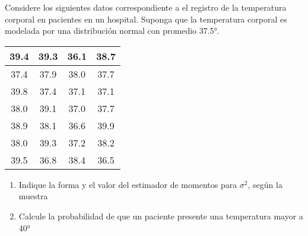 \documentclass[12pt]{article}
\newenvironment{problem}[2][Problema]{\begin{trivlist}
\item[\hskip \labelsep {\bfseries #1}\hskip \labelsep {\bfseries #2.}]}{\end{trivlist}}
\begin{document}
\begin{problem}{III}
Considere los siguientes datos correspondiente a el registro de la temperatura corporal en pacientes en un hospital. Suponga que la temperatura corporal es modelada por una distribución normal con promedio 37.5°.
\begin{table}[h!]
    \centering
    \begin{tabular}{|c|c|c|c|}
        \hline
        39.4 & 39.3 & 36.1 & 38.7 \\ \hline
        37.4 & 37.9 & 38.0 & 37.7 \\ \hline
        39.8 & 37.4 & 37.1 & 37.1 \\ \hline
        38.0 & 39.1 & 37.0 & 37.7 \\ \hline
        38.9 & 38.1 & 36.6 & 39.9 \\ \hline
        38.0 & 39.3 & 37.2 & 38.2 \\ \hline
        39.5 & 36.8 & 38.4 & 36.5 \\ \hline
    \end{tabular}
\end{table}

\begin{enumerate}[label=\alph*)] %
    \item 	Indique la forma y el valor del estimador de momentos para $\sigma^2$, según la muestra 
    \item Calcule la probabilidad de que un paciente presente una temperatura mayor a 40°
\end{enumerate}
\end{problem}
\end{document}
